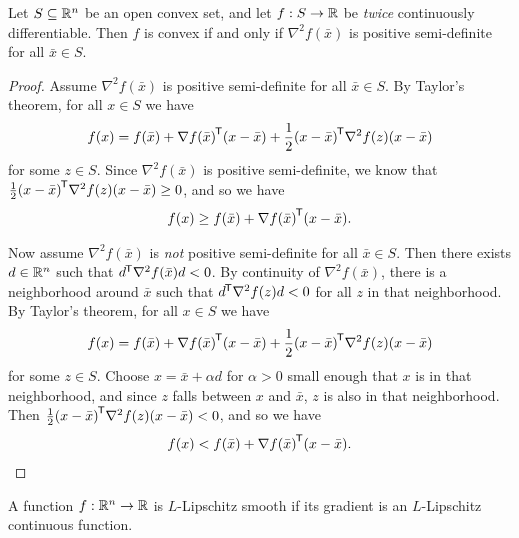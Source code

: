 \begin{thm}
    Let $S \subseteq \mathbb{R}^n$ be an open convex set, and let $f: S \to \mathbb{R}$ be \emph{twice} continuously differentiable. Then $f$ is convex if and only if $\nabla^2f(\bar{x})$ is positive semi-definite for all $\bar{x} \in S$.
\end{thm}

\begin{proof}\proofbreak
    Assume $\nabla^2f(\bar{x})$ is positive semi-definite for all $\bar{x} \in S$. By Taylor's theorem, for all $x \in S$ we have
    \begin{align*}
        f(x) = f(\bar{x}) + {\nabla f(\bar{x})}^{\mkern-1.5mu\mathsf{T}}(x - \bar{x}) + \frac{1}{2}{(x - \bar{x})}^{\mkern-1.5mu\mathsf{T}}\nabla^2f(z)(x - \bar{x})
    \end{align*}
    for some $z \in S$. Since $\nabla^2f(\bar{x})$ is positive semi-definite, we know that $\frac{1}{2}{(x - \bar{x})}^{\mkern-1.5mu\mathsf{T}}\nabla^2f(z)(x - \bar{x}) \geq 0$, and so we have
    \begin{align*}
        f(x) \geq f(\bar{x}) + {\nabla f(\bar{x})}^{\mkern-1.5mu\mathsf{T}}(x - \bar{x}).
    \end{align*}

    Now assume $\nabla^2f(\bar{x})$ is \emph{not} positive semi-definite for all $\bar{x} \in S$. Then there exists $d \in \mathbb{R}^n$ such that ${d}^{\mkern-1.5mu\mathsf{T}}\nabla^2f(\bar{x})d < 0$. By continuity of $\nabla^2f(\bar{x})$, there is a neighborhood around $\bar{x}$ such that ${d}^{\mkern-1.5mu\mathsf{T}}\nabla^2f(z)d < 0$ for all $z$ in that neighborhood. By Taylor's theorem, for all $x \in S$ we have
    \begin{align*}
        f(x) = f(\bar{x}) + {\nabla f(\bar{x})}^{\mkern-1.5mu\mathsf{T}}(x - \bar{x}) + \frac{1}{2}{(x - \bar{x})}^{\mkern-1.5mu\mathsf{T}}\nabla^2f(z)(x - \bar{x})
    \end{align*}
    for some $z \in S$. Choose $x = \bar{x} + \alpha d$ for $\alpha > 0$ small enough that $x$ is in that neighborhood, and since $z$ falls between $x$ and $\bar{x}$, $z$ is also in that neighborhood. Then $\frac{1}{2}{(x - \bar{x})}^{\mkern-1.5mu\mathsf{T}}\nabla^2f(z)(x - \bar{x}) < 0$, and so we have
    \begin{align*}
        f(x) < f(\bar{x}) + {\nabla f(\bar{x})}^{\mkern-1.5mu\mathsf{T}}(x - \bar{x}).
    \end{align*}
\end{proof}

\begin{defn}
    A function $f: \mathbb{R}^n \to \mathbb{R}$ is $L$-Lipschitz smooth if its gradient is an $L$-Lipschitz continuous function.
\end{defn}

